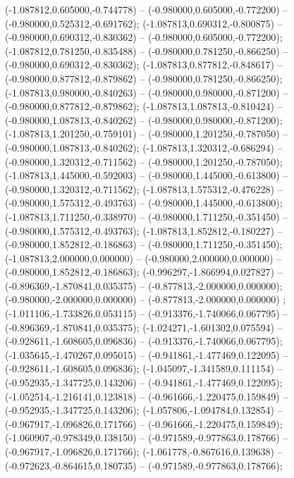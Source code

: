  (-1.087812,0.605000,-0.744778) -- (-0.980000,0.605000,-0.772200) -- (-0.980000,0.525312,-0.691762);
 (-1.087813,0.690312,-0.800875) -- (-0.980000,0.690312,-0.830362) -- (-0.980000,0.605000,-0.772200);
 (-1.087812,0.781250,-0.835488) -- (-0.980000,0.781250,-0.866250) -- (-0.980000,0.690312,-0.830362);
 (-1.087813,0.877812,-0.848617) -- (-0.980000,0.877812,-0.879862) -- (-0.980000,0.781250,-0.866250);
 (-1.087813,0.980000,-0.840263) -- (-0.980000,0.980000,-0.871200) -- (-0.980000,0.877812,-0.879862);
 (-1.087813,1.087813,-0.810424) -- (-0.980000,1.087813,-0.840262) -- (-0.980000,0.980000,-0.871200);
 (-1.087813,1.201250,-0.759101) -- (-0.980000,1.201250,-0.787050) -- (-0.980000,1.087813,-0.840262);
 (-1.087813,1.320312,-0.686294) -- (-0.980000,1.320312,-0.711562) -- (-0.980000,1.201250,-0.787050);
 (-1.087813,1.445000,-0.592003) -- (-0.980000,1.445000,-0.613800) -- (-0.980000,1.320312,-0.711562);
 (-1.087813,1.575312,-0.476228) -- (-0.980000,1.575312,-0.493763) -- (-0.980000,1.445000,-0.613800);
 (-1.087813,1.711250,-0.338970) -- (-0.980000,1.711250,-0.351450) -- (-0.980000,1.575312,-0.493763);
 (-1.087813,1.852812,-0.180227) -- (-0.980000,1.852812,-0.186863) -- (-0.980000,1.711250,-0.351450);
 (-1.087813,2.000000,0.000000) -- (-0.980000,2.000000,0.000000) -- (-0.980000,1.852812,-0.186863);
 (-0.996297,-1.866994,0.027827) -- (-0.896369,-1.870841,0.035375) -- (-0.877813,-2.000000,0.000000);
 (-0.980000,-2.000000,0.000000) -- (-0.877813,-2.000000,0.000000) ;
 (-1.011106,-1.733826,0.053115) -- (-0.913376,-1.740066,0.067795) -- (-0.896369,-1.870841,0.035375);
 (-1.024271,-1.601302,0.075594) -- (-0.928611,-1.608605,0.096836) -- (-0.913376,-1.740066,0.067795);
 (-1.035645,-1.470267,0.095015) -- (-0.941861,-1.477469,0.122095) -- (-0.928611,-1.608605,0.096836);
 (-1.045097,-1.341589,0.111154) -- (-0.952935,-1.347725,0.143206) -- (-0.941861,-1.477469,0.122095);
 (-1.052514,-1.216141,0.123818) -- (-0.961666,-1.220475,0.159849) -- (-0.952935,-1.347725,0.143206);
 (-1.057806,-1.094784,0.132854) -- (-0.967917,-1.096826,0.171766) -- (-0.961666,-1.220475,0.159849);
 (-1.060907,-0.978349,0.138150) -- (-0.971589,-0.977863,0.178766) -- (-0.967917,-1.096826,0.171766);
 (-1.061778,-0.867616,0.139638) -- (-0.972623,-0.864615,0.180735) -- (-0.971589,-0.977863,0.178766);
